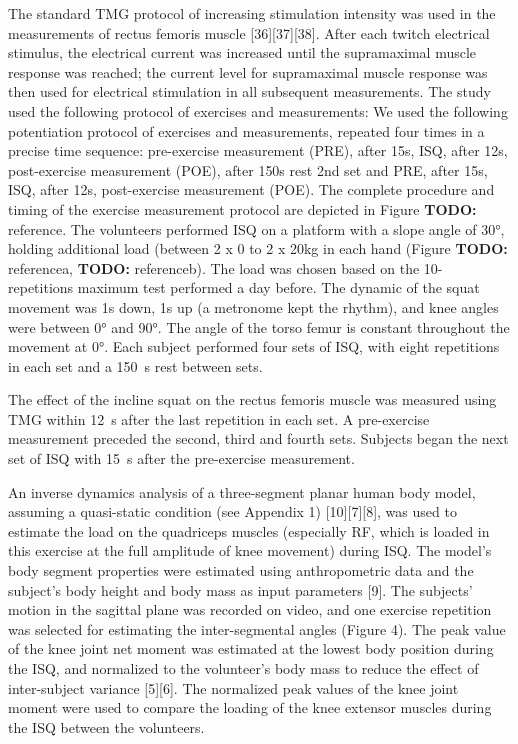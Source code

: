 \documentclass[utf8]{style/FrontiersinHarvard}
\newcommand{\TODO}[1]{{\textbf{TODO:} {\color{red} #1}}}
\begin{document}
The standard TMG protocol of increasing stimulation intensity was used in the measurements of rectus femoris muscle [36][37][38].
After each twitch electrical stimulus, the electrical current was increased until the supramaximal muscle response was reached;
the current level for supramaximal muscle response was then used for electrical stimulation in all subsequent measurements.
The study used the following protocol of exercises and measurements:
We used the following potentiation protocol of exercises and measurements, repeated four times in a precise time sequence: pre-exercise measurement (PRE), after 15s, ISQ, after 12s, post-exercise measurement (POE), after 150s rest 2nd set and PRE, after 15s, ISQ, after 12s, post-exercise measurement (POE).
The complete procedure and timing of the exercise measurement protocol are depicted in Figure \TODO{reference}.
The volunteers performed ISQ on a platform with a slope angle of 30°, holding additional load (between 2 x 0 to 2 x 20kg in each hand (Figure \TODO{reference}a, \TODO{reference}b).
The load was chosen based on the 10- repetitions maximum test performed a day before.
The dynamic of the squat movement was 1s down, 1s up (a metronome kept the rhythm), and knee angles were between 0° and 90°.
The angle of the torso femur is constant throughout the movement at 0°.
Each subject performed four sets of ISQ, with eight repetitions in each set and a \SI{150}{\second} rest between sets.

The effect of the incline squat on the rectus femoris muscle was measured using TMG within \SI{12}{\second} after the last repetition in each set.
A pre-exercise measurement preceded the second, third and fourth sets.
Subjects began the next set of ISQ with \SI{15}{\second} after the pre-exercise measurement.

An inverse dynamics analysis of a three-segment planar human body model, assuming a quasi-static condition (see Appendix 1) [10][7][8], was used to estimate the load on the quadriceps muscles (especially RF, which is loaded in this exercise at the full amplitude of knee movement) during ISQ.
The model's body segment properties were estimated using anthropometric data and the subject’s body height and body mass as input parameters [9].
The subjects' motion in the sagittal plane was recorded on video, and one exercise repetition was selected for estimating the inter-segmental angles (Figure 4).
The peak value of the knee joint net moment was estimated at the lowest body position during the ISQ,
and normalized to the volunteer’s body mass to reduce the effect of inter-subject variance [5][6].
The normalized peak values of the knee joint moment were used to compare the loading of the knee extensor muscles during the ISQ between the volunteers.
\end{document}

